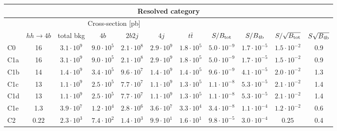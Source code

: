 \begin{tabular}{|l|cc|cccc|cccc|}
  \hline
\multicolumn{11}{|c|}{Resolved category}\\
\hline
&  \multicolumn{6}{c|}{Cross-section [pb]} &  &  & &  \\
   &  $hh\to 4b$ &  total bkg  &   $4b$    &  $2b2j$   &   $4j$    &
$t\bar{t}$ &
$S/B_{\rm tot}$ & $S/B_{\rm 4b}$ & $S/\sqrt{B_{\rm tot}}$ & $S\sqrt{B_{\rm 4b}}$ \\
  \hline
  \hline
 C0    & 16  &   $3.1\cdot 10^9$   & $9.0\cdot 10^5$ & $2.1\cdot 10^8$ & $2.9\cdot 10^9$ & $1.8\cdot 10^5$ &   $5.0\cdot 10^{-9}$   & $1.7\cdot 10^{-5}$ &   $1.5\cdot 10^{-2}$   & 0.9 \\
 C1a   & 16  &   $3.1\cdot 10^9$   & $9.0\cdot 10^5$ & $2.1\cdot 10^8$ & $2.9\cdot 10^9$ & $1.8\cdot 10^5$ &   $5.0\cdot 10^{-9}$   & $1.7\cdot 10^{-5}$  &   $1.5\cdot 10^{-2}$   & 0.9 \\
 C1b   & 14  &   $1.4\cdot 10^9$   & $3.4\cdot 10^5$ & $9.6\cdot 10^7$ & $1.4\cdot 10^9$ & $1.4\cdot 10^5$  &   $9.6\cdot 10^{-9}$   & $4.1\cdot 10^{-5}$ &   $2.0\cdot 10^{-2}$   & 1.3\\
 C1c   & 13  &   $1.1\cdot 10^9$   & $2.5\cdot 10^5$ & $7.7\cdot 10^7$ & $1.1\cdot 10^9$ & $1.3\cdot 10^5$ &   $1.1\cdot 10^{-8}$   & $5.3\cdot 10^{-5}$  &   $2.1\cdot 10^{-2}$   & 1.4  \\
 C1d   & 13 &   $1.1\cdot 10^9 $  & $2.5\cdot 10^5$ & $7.7\cdot 10^7$ & $1.1\cdot 10^9$ & $1.3\cdot 10^5$  &   $1.1\cdot 10^{-8}$   & $5.3\cdot 10^{-5}$  &   $2.1\cdot 10^{-2}$   & 1.4\\
 C1e   & 1.3  &   $3.9\cdot 10^7$   & $1.2\cdot 10^4$ & $2.8\cdot 10^6$ & $3.6\cdot 10^7$ & $3.3\cdot 10^4$  &   $3.4\cdot 10^{-8}$   & $1.1\cdot 10^{-4}$ &   $1.2\cdot 10^{-2}$   & 0.6\\
 C2    & 0.22  &   $2.3\cdot 10^3$   & $7.4\cdot 10^2$ & $1.4\cdot 10^3$ & $9.9\cdot 10^1$ & $1.6\cdot 10^1$  &   $9.8\cdot 10^{-5}$   & $3.0\cdot 10^{-4}$  &  $0.25$   & 0.4 \\
\hline
\end{tabular}
